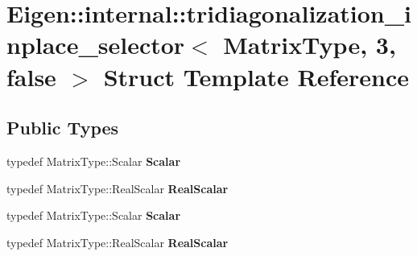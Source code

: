 \hypertarget{struct_eigen_1_1internal_1_1tridiagonalization__inplace__selector_3_01_matrix_type_00_013_00_01false_01_4}{}\section{Eigen\+:\+:internal\+:\+:tridiagonalization\+\_\+inplace\+\_\+selector$<$ Matrix\+Type, 3, false $>$ Struct Template Reference}
\label{struct_eigen_1_1internal_1_1tridiagonalization__inplace__selector_3_01_matrix_type_00_013_00_01false_01_4}
\subsection*{Public Types}
\begin{DoxyCompactItemize}
\item 
\mbox{\label{struct_eigen_1_1internal_1_1tridiagonalization__inplace__selector_3_01_matrix_type_00_013_00_01false_01_4_a5883a03d4f36f351aa6eaa60328a7aa0}} 
typedef Matrix\+Type\+::\+Scalar {\bfseries Scalar}
\item 
\mbox{\label{struct_eigen_1_1internal_1_1tridiagonalization__inplace__selector_3_01_matrix_type_00_013_00_01false_01_4_ad5d2284e77ed0cef41def1a4d78c1690}} 
typedef Matrix\+Type\+::\+Real\+Scalar {\bfseries Real\+Scalar}
\item 
\mbox{\label{struct_eigen_1_1internal_1_1tridiagonalization__inplace__selector_3_01_matrix_type_00_013_00_01false_01_4_a5883a03d4f36f351aa6eaa60328a7aa0}} 
typedef Matrix\+Type\+::\+Scalar {\bfseries Scalar}
\item 
\mbox{\label{struct_eigen_1_1internal_1_1tridiagonalization__inplace__selector_3_01_matrix_type_00_013_00_01false_01_4_ad5d2284e77ed0cef41def1a4d78c1690}} 
typedef Matrix\+Type\+::\+Real\+Scalar {\bfseries Real\+Scalar}
\end{DoxyCompactItemize}
